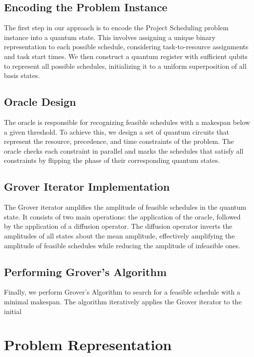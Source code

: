 \subsection{Encoding the Problem Instance}

The first step in our approach is to encode the Project Scheduling problem instance into a quantum state. This involves assigning a unique binary representation to each possible schedule, considering task-to-resource assignments and task start times. We then construct a quantum register with sufficient qubits to represent all possible schedules, initializing it to a uniform superposition of all basis states.

\subsection{Oracle Design}

The oracle is responsible for recognizing feasible schedules with a makespan below a given threshold. To achieve this, we design a set of quantum circuits that represent the resource, precedence, and time constraints of the problem. The oracle checks each constraint in parallel and marks the schedules that satisfy all constraints by flipping the phase of their corresponding quantum states.

\subsection{Grover Iterator Implementation}

The Grover iterator amplifies the amplitude of feasible schedules in the quantum state. It consists of two main operations: the application of the oracle, followed by the application of a diffusion operator. The diffusion operator inverts the amplitudes of all states about the mean amplitude, effectively amplifying the amplitude of feasible schedules while reducing the amplitude of infeasible ones.

\subsection{Performing Grover's Algorithm}

Finally, we perform Grover's Algorithm to search for a feasible schedule with a minimal makespan. The algorithm iteratively applies the Grover iterator to the initial

\section{Problem Representation}

